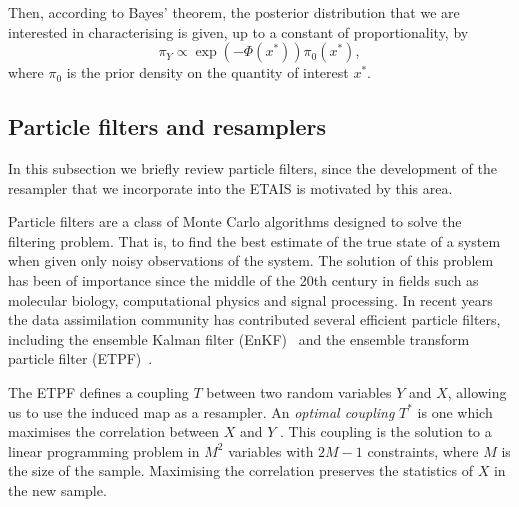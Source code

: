 \documentclass[final]{siamltex}
\begin{document}
Then, according to Bayes' theorem, the posterior distribution that we
are interested in characterising is given, up to a constant of proportionality, by
\begin{equation*}
	\pi_Y \propto \exp \left ( -\Phi(x^*) \right )\pi_0(x^*),
\end{equation*}
where $\pi_0$ is the prior density on the quantity of interest $x^*$.



\subsection{Particle filters and resamplers}\label{sec:filters}
In this subsection we briefly review particle filters, since the
development of the resampler that we incorporate into the ETAIS is
motivated by this area.

Particle filters are a class of Monte Carlo algorithms designed to
solve the filtering problem. That is, to find the best estimate of the
true state of a system when given only noisy observations of the
system. The solution of this problem has been of importance since the
middle of the 20th century in fields such as molecular biology,
computational physics and signal processing. In recent years the data
assimilation community has contributed several efficient particle
filters, including the ensemble Kalman filter
(EnKF)~\cite{evensen1994sequential} and the ensemble transform
particle filter (ETPF)~\cite{reich2013nonparametric}.

The ETPF defines a coupling $T$ between two random variables $Y$ and
$X$, allowing us to use the induced map as a resampler. An \emph{optimal
coupling} $T^*$ is one which maximises the correlation between $X$ and
$Y$ \cite{cotter2012ensemble}. This coupling is the solution to a
linear programming problem in $M^2$ variables with $2M-1$ constraints,
where $M$ is the size of the sample. Maximising the correlation
preserves the statistics of $X$ in the new sample.
\end{document}
